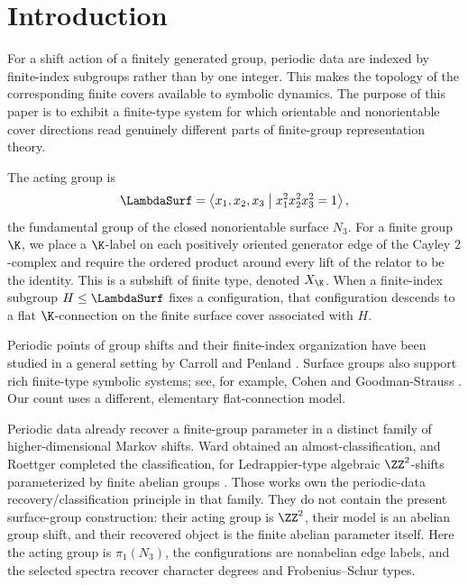 \section{Introduction}
\label{sec:introduction}

For a shift action of a finitely generated group, periodic data are indexed by
finite-index subgroups rather than by one integer.  This makes the topology of
the corresponding finite covers available to symbolic dynamics.  The purpose
of this paper is to exhibit a finite-type system for which orientable and
nonorientable cover directions read genuinely different parts of finite-group
representation theory.

The acting group is
\begin{equation}
 \LambdaSurf
 =\left\langle x_1,x_2,x_3
   \mathrel{\big|}x_1^2x_2^2x_3^2=1\right\rangle,
 \label{eq:surface-presentation}
\end{equation}
the fundamental group of the closed nonorientable surface $N_3$.  For a
finite group $\K$, we place a $\K$-label on each positively oriented generator
edge of the Cayley $2$-complex and require the ordered product around every
lift of the relator to be the identity.  This is a subshift of finite type,
denoted $X_{\K}$.  When a finite-index subgroup $H\leq\LambdaSurf$ fixes a
configuration, that configuration descends to a flat $\K$-connection on the
finite surface cover associated with $H$.

Periodic points of group shifts and their finite-index organization have been
studied in a general setting by Carroll and Penland
\cite{CarrollPenland2015}.  Surface groups also support rich finite-type
symbolic systems; see, for example, Cohen and Goodman-Strauss
\cite{CohenGoodmanStrauss2017}.  Our count uses a different, elementary
flat-connection model.

Periodic data already recover a finite-group parameter in a distinct family of
higher-dimensional Markov shifts.  Ward obtained an almost-classification, and
Roettger completed the classification, for Ledrappier-type algebraic
$\ZZ^2$-shifts parameterized by finite abelian groups
\cite{Ward1998,Roettger2005}.  Those works own the periodic-data
recovery/classification principle in that family.  They do not contain the
present surface-group construction: their acting group is $\ZZ^2$, their model
is an abelian group shift, and their recovered object is the finite abelian
parameter itself.  Here the acting group is $\pi_1(N_3)$, the configurations
are nonabelian edge labels, and the selected spectra recover character degrees
and Frobenius--Schur types.

